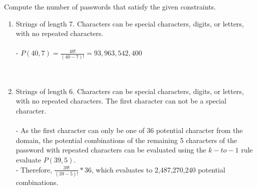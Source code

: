 \documentclass{amsart}
\theoremstyle{definition}
\theoremstyle{Exercise}
\theoremstyle{remark}
\theoremstyle{rule}
\numberwithin{equation}{section}
\begin{document}
Compute the number of passwords that satisfy the given constraints.
    \begin{enumerate}[label=(\roman*)]
    \item Strings of length 7. Characters can be special characters, digits, or letters, with no repeated characters.\\\\
  - $P(40, 7)=\frac{40!}{(40-7)!} = 93,963,542,400$\\
\\\\
    \item Strings of length 6. Characters can be special characters, digits, or letters, with no repeated characters. The first character can not be a special character.\\\\
  - As the first character can only be one of 36 potential character from the domain, the potential combinations of the remaining 5 characters of the password with
  repeated characters can be evaluated using the $k-to-1$ rule evaluate $P(39,5)$.\\
  - Therefore, $\frac{39!}{(39-5)!}*36$, which evaluates to 2,487,270,240 potential combinations.
    \end{enumerate}
 \newpage
\vspace*{0.1in}
\end{document}
